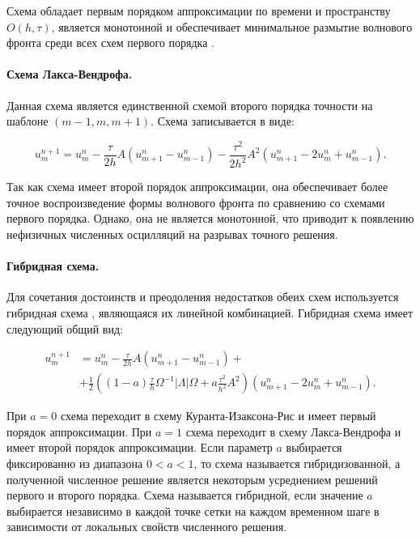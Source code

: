 Схема обладает первым порядком аппроксимации по времени и пространству $O(h, \tau)$, является монотонной и обеспечивает минимальное размытие волнового фронта среди всех схем первого порядка \cite{magomedov}.

\paragraph{Схема Лакса-Вендрофа.} Данная схема является единственной схемой второго порядка точности на шаблоне $(m-1, m, m+1)$. Схема записывается в виде:

\begin{equation}
	\label{LW scheme}
	u^{n+1}_m = u^n_m - \frac{\tau}{2h} A (u^n_{m+1} - u^n_{m-1})
	 - \frac{\tau^2}{2h^2} A^2 (u^n_{m+1} - 2u^n_m + u^n_{m-1}) .
\end{equation}

Так как схема имеет второй порядок аппроксимации, она обеспечивает более точное воспроизведение формы волнового фронта по сравнению со схемами первого порядка. Однако, она не является монотонной, что приводит к появлению нефизичных численных осцилляций на разрывах точного решения.


\paragraph{Гибридная схема.} Для сочетания достоинств и преодоления недостатков обеих схем используется гибридная схема \cite{fedorenko}, являющаяся их линейной комбинацией. Гибридная схема имеет следующий общий вид:

\begin{align}
\label{hybrid scheme}
u^{n+1}_m &= u^n_m - \frac{\tau}{2h} A (u^n_{m+1} - u^n_{m-1}) + \nonumber\\
	 &+ \frac{1}{2} ((1-a) \frac{\tau}{h} \Omega^{-1} |\Lambda| \Omega + a \frac{\tau^2}{h^2} A^2 ) (u^n_{m+1} - 2u^n_m + u^n_{m-1}).
\end{align}

При $a = 0$ схема переходит в схему Куранта-Изаксона-Рис и имеет первый порядок аппроксимации. При $a = 1$ схема переходит в схему Лакса-Вендрофа и имеет второй порядок аппроксимации. Если параметр $a$ выбирается фиксированно из диапазона $0 < a < 1$, то схема называется гибридизованной, а полученной численное решение является некоторым усреднением решений первого и второго порядка. Схема называется гибридной, если значение $a$ выбирается независимо в каждой точке сетки на каждом временном шаге в зависимости от локальных свойств численного решения.

